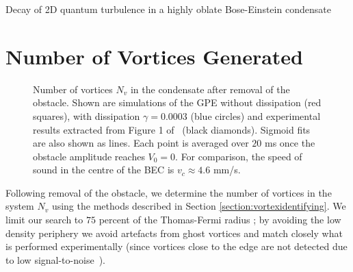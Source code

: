 \begin{chapter}{\label{cha:shin}Decay of 2D quantum turbulence in a highly oblate Bose-Einstein condensate}
\section{Number of Vortices Generated}
\begin{figure}
\begin{center}
\end{center}
\caption{\label{fig:N_vV} Number of vortices $N_v$ in the condensate after removal of the obstacle. Shown are simulations of the GPE without dissipation (red squares), with dissipation $\gamma = 0.0003$ (blue circles) and experimental results extracted from Figure 1 of~\citep{kwon_moon_14} (black diamonds). Sigmoid fits are also shown as lines. Each point is averaged over $20$ ms once the obstacle amplitude reaches $V_0=0$.  For comparison, the speed of sound in the centre of the BEC is $v_c\approx 4.6$ mm/s.  }
\end{figure} 
Following removal of the obstacle, we determine the number of vortices in the system $N_v$ using the methods described in Section \ref{section:vortexidentifying}.  
We limit our search to $75$ percent of the Thomas-Fermi radius ; by avoiding the low density periphery we avoid artefacts from ghost vortices and match closely what is performed experimentally (since vortices close to the edge are not detected due to low signal-to-noise~\citep{shin_private}). 


\end{chapter}
